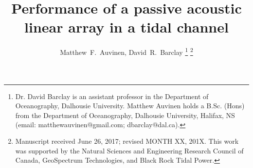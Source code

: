 \documentclass[12pt,journal,onecolumn]{IEEEtran}
\begin{document}
%
\title{Performance of a passive acoustic \\ linear array in a tidal channel}
%
%
%

\author{Matthew~F.~Auvinen, 
        David~R.~Barclay %
\thanks{Dr. David Barclay is an assistant professor in the Department of Oceanography, Dalhousie University. Matthew Auvinen holds a B.Sc. (Hons) from the Department of Oceanography, Dalhousie University, Halifax, NS (email: matthewauvinen@gmail.com; dbarclay@dal.ca).} %
\thanks{Manuscript received June 26, 2017; revised MONTH XX, 201X. This work was supported by the Natural Sciences and Engineering Research Council of Canada, GeoSpectrum Technologies, and Black Rock Tidal Power.}}%




% 
%
\end{document}
